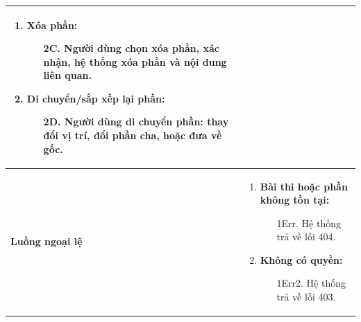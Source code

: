 {\begin{tabularx}{\textwidth}{|>{\raggedright\arraybackslash}p{3.5cm}|>{\raggedright\arraybackslash}X|}
\begin{enumerate}
    \item \textbf{Xóa phần:}
    \begin{enumerate}
        \item[2C.] Người dùng chọn xóa phần, xác nhận, hệ thống xóa phần và nội dung liên quan.
    \end{enumerate}
    \item \textbf{Di chuyển/sắp xếp lại phần:}
    \begin{enumerate}
        \item[2D.] Người dùng di chuyển phần: thay đổi vị trí, đổi phần cha, hoặc đưa về gốc.
    \end{enumerate}
\end{enumerate} \\
\hline
\textbf{Luồng ngoại lệ} &
\begin{enumerate}
    \item \textbf{Bài thi hoặc phần không tồn tại:}
    \begin{enumerate}
        \item[1Err.] Hệ thống trả về lỗi 404.
    \end{enumerate}
    \item \textbf{Không có quyền:}
    \begin{enumerate}
        \item[1Err2.] Hệ thống trả về lỗi 403.
    \end{enumerate}
\end{enumerate} \\
\hline
\end{tabularx}
}
